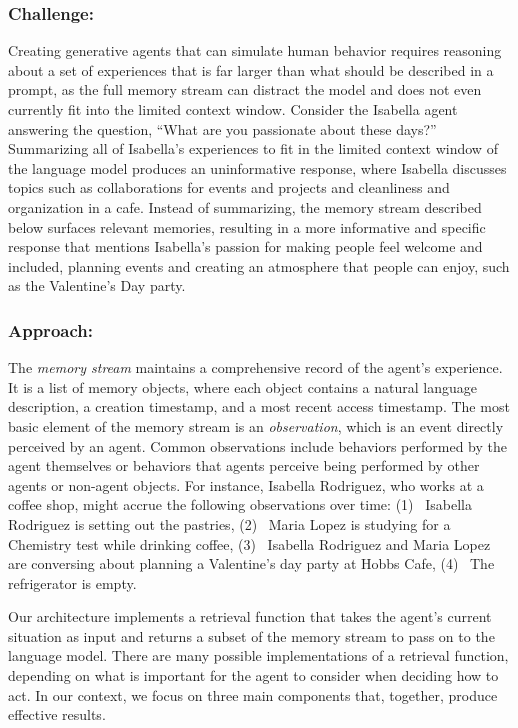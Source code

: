 \subsubsection*{Challenge:} Creating generative agents that can simulate human behavior requires reasoning about a set of experiences that is far larger than what should be described in a prompt, as the full memory stream can distract the model and does not even currently fit into the limited context window. Consider the Isabella agent answering the question, ``What are you passionate about these days?'' Summarizing all of Isabella's experiences to fit in the limited context window of the language model produces an uninformative response, where Isabella discusses topics such as collaborations for events and projects and cleanliness and organization in a cafe. Instead of summarizing, the memory stream described below surfaces relevant memories, resulting in a more informative and specific response that mentions Isabella's passion for making people feel welcome and included, planning events and creating an atmosphere that people can enjoy, such as the Valentine's Day party.

\subsubsection*{Approach:}
The \textit{memory stream} maintains a comprehensive record of the agent's experience. It is a list of memory objects, where each object contains a natural language description, a creation timestamp, and a most recent access timestamp. The most basic element of the memory stream is an \textit{observation}, which is an event directly perceived by an agent. Common observations include behaviors performed by the agent themselves or behaviors that agents perceive being performed by other agents or non-agent objects. For instance, Isabella Rodriguez, who works at a coffee shop, might accrue the following observations over time: (1)~{\color{darkgray}\small\fontfamily{}\selectfont
Isabella Rodriguez is setting out the pastries}, (2)~{\color{darkgray}\small\fontfamily{}\selectfont
Maria Lopez is studying for a Chemistry test while drinking coffee}, (3)~{\color{darkgray}\small\fontfamily{}\selectfont
Isabella Rodriguez and Maria Lopez are conversing about planning a Valentine's day party at Hobbs Cafe}, (4)~{\color{darkgray}\small\fontfamily{}\selectfont
The refrigerator is empty}.

Our architecture implements a retrieval function that takes the agent's current situation as input and returns a subset of the memory stream to pass on to the language model. There are many possible implementations of a retrieval function, depending on what is important for the agent to consider when deciding how to act. In our context, we focus on three main components that, together, produce effective results.

